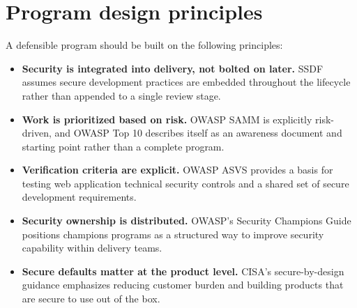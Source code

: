 \documentclass[11pt]{article}
\begin{document}
\section{Program design principles}
A defensible program should be built on the following principles:
\begin{itemize}
  \item \textbf{Security is integrated into delivery, not bolted on later.} SSDF assumes secure development practices are embedded throughout the lifecycle rather than appended to a single review stage.\cite{nist-ssdf}
  \item \textbf{Work is prioritized based on risk.} OWASP SAMM is explicitly risk-driven, and OWASP Top 10 describes itself as an awareness document and starting point rather than a complete program.\cite{owasp-samm,owasp-top10-program}
  \item \textbf{Verification criteria are explicit.} OWASP ASVS provides a basis for testing web application technical security controls and a shared set of secure development requirements.\cite{owasp-asvs}
  \item \textbf{Security ownership is distributed.} OWASP's Security Champions Guide positions champions programs as a structured way to improve security capability within delivery teams.\cite{owasp-champions}
  \item \textbf{Secure defaults matter at the product level.} CISA's secure-by-design guidance emphasizes reducing customer burden and building products that are secure to use out of the box.\cite{cisa-sbd}
\end{itemize}
\end{document}

